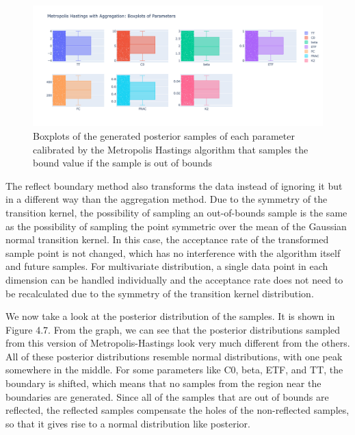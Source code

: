 \begin{figure}[H]
    \centering
    \includegraphics[width=1\textwidth]{figures/basic_mh/aggr_mh/aggr_mh_boxplot.png}
    \captionsetup{width=.8\textwidth}
    \caption{Boxplots of the generated posterior samples of each parameter
calibrated by the Metropolis Hastings algorithm that samples the bound value if the sample is out of bounds}
    \label{fig:enter-label}
\end{figure}



The reflect boundary method also transforms the data instead of ignoring it but in a different way than the aggregation method. Due to the symmetry of the transition kernel, the possibility of sampling an out-of-bounds sample is the same as the possibility of sampling the point symmetric over the mean of the Gaussian normal transition kernel.\cite{gaussian_distribution_property} In this case, the acceptance rate of the transformed sample point is not changed, which has no interference with the algorithm itself and future samples. For multivariate distribution, a single data point in each dimension can be handled individually and the acceptance rate does not need to be recalculated due to the symmetry of the transition kernel distribution. 

We now take a look at the posterior distribution of the samples. It is shown in Figure 4.7. From the graph, we can see that the posterior distributions sampled from this version of Metropolis-Hastings look very much different from the others. All of these posterior distributions resemble normal distributions, with one peak somewhere in the middle. For some parameters like C0, beta, ETF, and TT, the boundary is shifted, which means that no samples from the region near the boundaries are generated. Since all of the samples that are out of bounds are reflected, the reflected samples compensate the holes of the non-reflected samples, so that it gives rise to a normal distribution like posterior.

